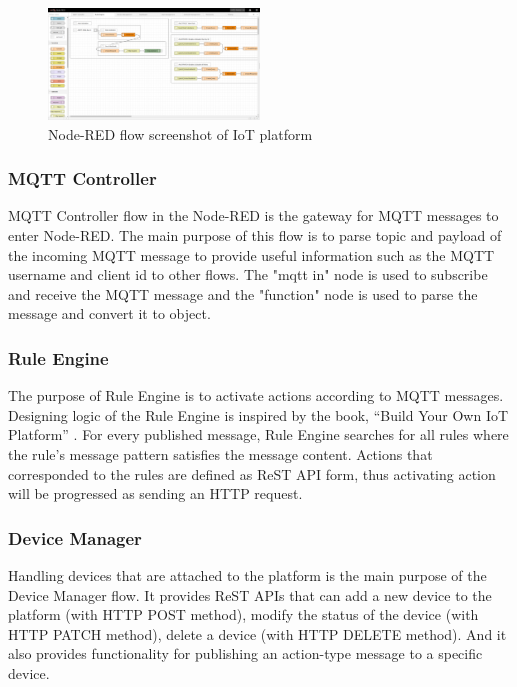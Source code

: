 \documentclass[conference]{IEEEtran}
\begin{document}
\begin{figure}[htbp]
\centerline{\includegraphics[width=0.5\textwidth]{./images/node-red-platform-screenshot.png}}
\caption{Node-RED flow screenshot of IoT platform}
\label{fig}
\end{figure}

\subsubsection{MQTT Controller}
MQTT Controller flow in the Node-RED is the gateway for MQTT messages to enter Node-RED.
The main purpose of this flow is to parse topic and payload of the incoming MQTT message to provide useful information such as the MQTT username and client id to other flows.
The "mqtt in" node is used to subscribe and receive the MQTT message and the "function" node is used to parse the message and convert it to object.

\subsubsection{Rule Engine}
The purpose of Rule Engine is to activate actions according to MQTT messages.
Designing logic of the Rule Engine is inspired by the book, “Build Your Own IoT Platform” \cite{b22}.
For every published message, Rule Engine searches for all rules where the rule’s message pattern satisfies the message content.
Actions that corresponded to the rules are defined as ReST API form, thus activating action will be progressed as sending an HTTP request.

\subsubsection{Device Manager}
Handling devices that are attached to the platform is the main purpose of the Device Manager flow. It provides ReST APIs that can add a new device to the platform (with HTTP POST method), modify the status of the device (with HTTP PATCH method), delete a device (with HTTP DELETE method). And it also provides functionality for publishing an action-type message to a specific device.
\end{document}
